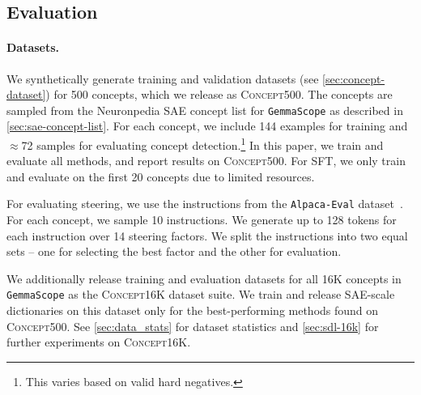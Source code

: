 \documentclass{article}
\theoremstyle{plain}
\theoremstyle{definition}
\theoremstyle{remark}
\renewcommand{\cite}{\citep}
\begin{document}

\subsection{Evaluation}\label{sec:evaluation}

\paragraph{Datasets.} We synthetically generate training and validation datasets (see \cref{sec:concept-dataset}) for 500 concepts, which we release as \textsc{Concept500}. The concepts are sampled from the Neuronpedia SAE concept list for \texttt{GemmaScope} as described in \cref{sec:sae-concept-list}. For each concept, we include 144 examples for training and $\approx$72 samples for evaluating concept detection.\footnote{This varies based on valid hard negatives.} In this paper, we train and evaluate all methods, and report results on \textsc{Concept500}. For SFT, we only train and evaluate on the first 20 concepts due to limited resources.

For evaluating steering, we use the instructions from the \texttt{Alpaca-Eval} dataset~\cite{alpaca_eval}. For each concept, we sample 10 instructions. We generate up to 128 tokens for each instruction over 14 steering factors. We split the instructions into two equal sets -- one for selecting the best factor and the other for evaluation.

We additionally release training and evaluation datasets for all 16K concepts in \texttt{GemmaScope} as the \textsc{Concept16K} dataset suite. We train and release SAE-scale dictionaries on this dataset only for the best-performing methods found on \textsc{Concept500}. See \cref{sec:data_stats} for dataset statistics and \cref{sec:sdl-16k} for further experiments on \textsc{Concept16K}.
\end{document}
